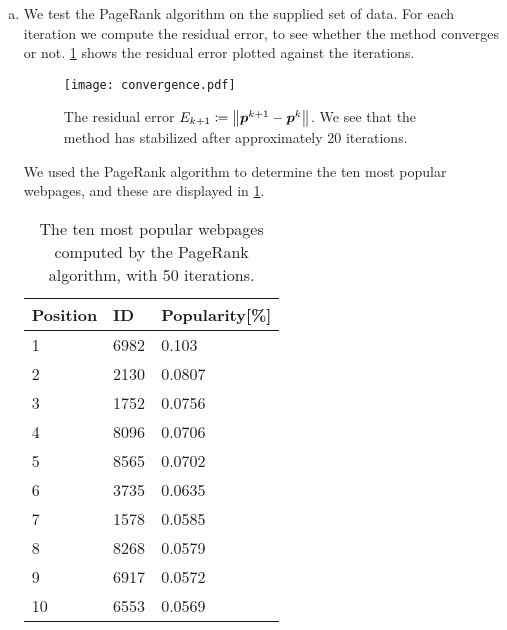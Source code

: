 \documentclass[12pt, oneside, article, a4paper]{memoir}
\newcommand{\mat}[1]{\bm{#1}}
\begin{document}
\begin{enumerate}[a)]
        \item
            We test the PageRank algorithm on the supplied set of data. For
            each iteration we compute the residual error, to see whether the
            method converges or not. \cref{fig:convergence} shows the residual
            error plotted against the iterations.
            \begin{figure}[htbp]
                \centering
                \texttt{[image: convergence.pdf]}
                \caption{The residual error \( E_{k+1} \coloneqq
                \norm{\mat{p}^{k+1} - \mat{p}^k} \). We see that the method has
            stabilized after approximately 20 iterations.}
                \label{fig:convergence}
            \end{figure}
            We used the PageRank algorithm to determine the ten most popular
            webpages, and these are displayed in \cref{tbl:most_popular}.
            \begin{table}[htbp]
                \centering
                \caption{The ten most popular webpages computed by the PageRank
                algorithm, with 50 iterations.}
                \label{tbl:most_popular}
                \begin{tabular}{lll}
                    \toprule
                    Position & ID & Popularity[\%] \\
                    \midrule
                    1 & 6982 &	 0.103  \\
                    2 & 2130 &	 0.0807 \\
                    3 & 1752 &	 0.0756 \\
                    4 & 8096 &	 0.0706 \\
                    5 & 8565 &	 0.0702 \\
                    6 & 3735 &	 0.0635 \\
                    7 & 1578 &	 0.0585 \\
                    8 & 8268 &	 0.0579 \\
                    9 & 6917 &	 0.0572 \\
                    10 & 6553 &	 0.0569 \\
                    \bottomrule
                \end{tabular}
            \end{table}
        \end{enumerate}
\end{document}
